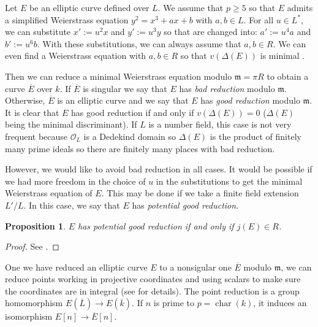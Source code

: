 \documentclass[a4paper,10pt]{report}
\theoremstyle{definition}
\theoremstyle{plain}
\newtheorem{Proposition}[Definition]{Proposition}
\theoremstyle{definition}
\newcommand{\mO}{\mathcal{O}}
\renewcommand{\(}{\left(}
\renewcommand{\)}{\right)}
\newcommand{\mfm}{\mathfrak{m}}
\DeclareMathOperator{\Char}{char}%
\begin{document}
Let $E$ be an elliptic curve defined over $L$.  We assume that $p\geq 5$ so that $E$ admits a simplified Weierstrass equation $y^2=x^3+ax+b$ with $a,b\in L$.  For all $u\in L^*$,  we can substitute $x':=u^2 x$ and $y':=u^3 y$ so that are changed into: $a':=u^4a$ and  $b':=u^6b$.  With these substitutions,  we can always assume that $a, b\in R$.  We can even find a Weierstrass equation with $a, b\in R$ so that $v(\Delta(E))$ is minimal \cite[Proposition VII.1.3.(a)]{Silverman1}.  

Then we can reduce a minimal Weierstrass equation modulo $\mfm=\pi R$ to obtain a curve $\overline{E}$ over $k$.  If $\overline{E}$ is singular we say that $E$ has \emph{bad reduction} modulo $\mfm$.  Otherwise,  $\overline{E}$ is an elliptic curve and we say that $E$ has \emph{good reduction} modulo $\mfm$.  It is clear that $E$ has good reduction if and only if $v(\Delta(E))=0$ ($\Delta(E)$ being the minimal discriminant).  If $L$ is a number field,  this case is not very frequent because $\mO_L$ is a Dedekind domain so $\Delta(E)$ is the product of finitely many prime ideals so there are finitely many places with bad reduction.

However,  we would like to avoid bad reduction in all cases.  It would be possible if we had more freedom in the choice of $u$ in the substitutions to get the minimal Weierstrass equation of $E$.  This may be done if we take a finite field extension $L'/L$.  In this case, we say that $E$ has \emph{potential good reduction}.

\begin{Proposition}\label{Proposition 1}
$E$ has potential good reduction if and only if $j(E)\in R$. 
\end{Proposition}

\begin{proof}
See \cite[Proposition VII.5.5]{Silverman1}.
\end{proof}

One we have reduced an elliptic curve $E$ to a nonsigular one $\overline{E}$ modulo $\mfm$,  we can reduce points working in projective coordinates and using scalars to make sure the coordinates are in integral (see \cite[VII.2 and VII.3]{Silverman1} for details).  The point reduction is a group homomorphism $E(\overline{L})\longrightarrow E(\overline{k})$.  If $n$ is prime to $p=\Char(k)$,  it induces an isomorphism $E[n]\longrightarrow \overline{E}[n]$.  
\end{document}
